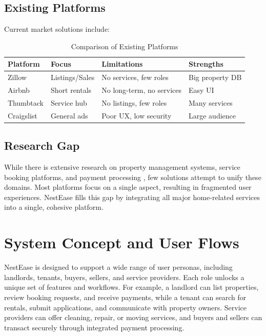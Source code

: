 \documentclass[conference]{IEEEtran}
\begin{document}
\subsection{Existing Platforms}
Current market solutions include:

\begin{table}[ht]
\centering
\caption{Comparison of Existing Platforms}
\begin{tabular}{|l|l|l|l|}
\hline
\textbf{Platform} & \textbf{Focus} & \textbf{Limitations} & \textbf{Strengths} \\
\hline
Zillow & Listings/Sales & No services, few roles & Big property DB \\
\hline
Airbnb & Short rentals & No long-term, no services & Easy UI \\
\hline
Thumbtack & Service hub & No listings, few roles & Many services \\
\hline
Craigslist & General ads & Poor UX, low security & Large audience \\
\hline
\end{tabular}
\end{table}


\subsection{Research Gap}
While there is extensive research on property management systems, service booking platforms, and payment processing \cite{real_estate_platforms}, few solutions attempt to unify these domains. Most platforms focus on a single aspect, resulting in fragmented user experiences. NestEase fills this gap by integrating all major home-related services into a single, cohesive platform.

\section{System Concept and User Flows}
NestEase is designed to support a wide range of user personas, including landlords, tenants, buyers, sellers, and service providers. Each role unlocks a unique set of features and workflows. For example, a landlord can list properties, review booking requests, and receive payments, while a tenant can search for rentals, submit applications, and communicate with property owners. Service providers can offer cleaning, repair, or moving services, and buyers and sellers can transact securely through integrated payment processing.
\end{document}
